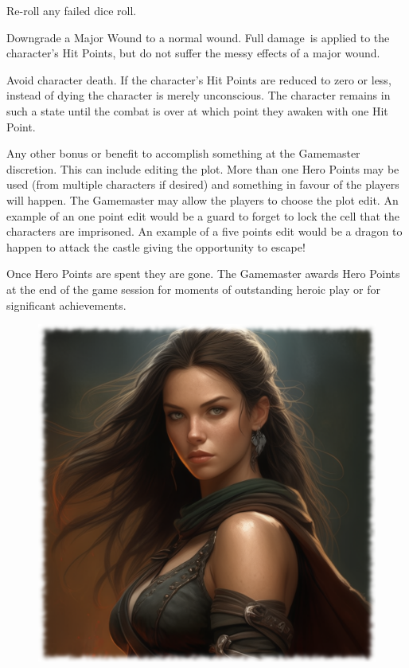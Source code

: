 \begin{rpg-list}
	\item Re-roll any failed dice roll.
	\item Downgrade a Major Wound to a normal wound. Full damage is applied to the character's Hit Points, but do not suffer the messy effects of a major wound.
	\item Avoid character death. If the character’s Hit Points are reduced to zero or less, instead of dying the character is merely unconscious. The character remains in such a state until the combat is over at which point they awaken with one Hit Point.
	\item Any other bonus or benefit to accomplish something at the Gamemaster discretion. This can include editing the plot. More than one Hero Points may be used (from multiple characters if desired) and something in favour of the players will happen. The Gamemaster may allow the players to choose the plot edit. An example of an one point edit would be a guard to forget to lock the cell that the characters are imprisoned. An example of a five points edit would be a dragon to happen to attack the castle giving the opportunity to escape!
\end{rpg-list}

Once Hero Points are spent they are gone. The Gamemaster awards Hero Points at the end of the game session for moments of outstanding heroic play or for significant achievements.

\begin{figure}%
\begin{center}
\includegraphics[scale=0.22]{img/ai-images/woman-beautiful.png}
\end{center}
\end{figure}

